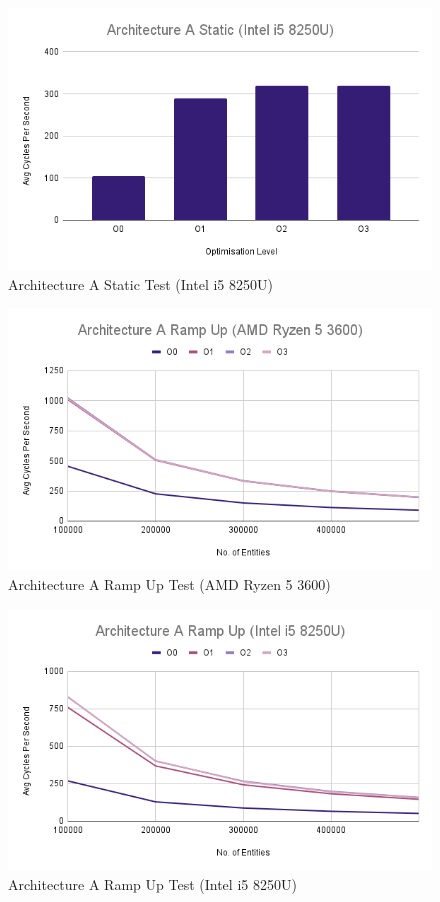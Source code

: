 \documentclass{article}
\begin{document}
\begin{figure}[!h]
\centering
\includegraphics[scale=0.5]{Architecture A Static (Intel i5 8250U).png}
\caption{Architecture A Static Test (Intel i5 8250U)}
\label{arch_a_static_laptop}
\end{figure}

\begin{figure}[!h]
\centering
\includegraphics[scale=0.5]{Architecture A Ramp Up (AMD Ryzen 5 3600).png}
\caption{Architecture A Ramp Up Test (AMD Ryzen 5 3600)}
\label{arch_a_ramp_up_pc}
\end{figure}

\begin{figure}[!h]
\centering
\includegraphics[scale=0.5]{Architecture A Ramp Up (Intel i5 8250U).png}
\caption{Architecture A Ramp Up Test (Intel i5 8250U)}
\label{arch_a_ramp_up_laptop}
\end{figure}
\end{document}
